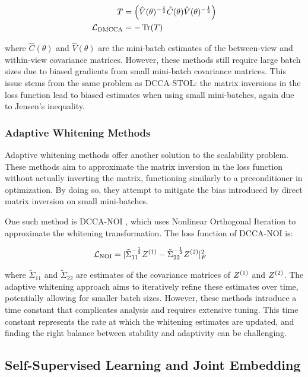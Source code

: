 \begin{align}
    T      & = \left(\hat{V}(\theta)^{-\frac{1}{2}} \hat{C}(\theta)\hat{V}(\theta)^{-\frac{1}{2}}\right) \\
    \mathcal{L}_\text{DMCCA} & = -\operatorname{Tr}(T)
\end{align}

where $\hat{C}(\theta)$ and $\hat{V}(\theta)$ are the mini-batch estimates of the between-view and within-view covariance matrices. However, these methods still require large batch sizes due to biased gradients from small mini-batch covariance matrices. This issue stems from the same problem as DCCA-STOL: the matrix inversions in the loss function lead to biased estimates when using small mini-batches, again due to Jensen's inequality.

\subsubsection{Adaptive Whitening Methods}
Adaptive whitening methods \citep{wang2015stochastic, chang2018scalable} offer another solution to the scalability problem. These methods aim to approximate the matrix inversion in the loss function without actually inverting the matrix, functioning similarly to a preconditioner in optimization. By doing so, they attempt to mitigate the bias introduced by direct matrix inversion on small mini-batches.

One such method is DCCA-NOI \citep{wang2015unsupervised}, which uses Nonlinear Orthogonal Iteration to approximate the whitening transformation. The loss function of DCCA-NOI is:

\begin{align}
    \mathcal{L}_\text{NOI} & = |{\tilde{\Sigma}_{11}}^{-\frac{1}{2}} Z^{(1)}-{\tilde{\Sigma}_{22}}^{-\frac{1}{2}} Z^{(2)}|^2_F
\end{align}

where $\tilde{\Sigma}_{11}$ and $\tilde{\Sigma}_{22}$ are estimates of the covariance matrices of $Z^{(1)}$ and $Z^{(2)}$. The adaptive whitening approach aims to iteratively refine these estimates over time, potentially allowing for smaller batch sizes. However, these methods introduce a time constant that complicates analysis and requires extensive tuning. This time constant represents the rate at which the whitening estimates are updated, and finding the right balance between stability and adaptivity can be challenging.

\subsection{Self-Supervised Learning and Joint Embedding}

